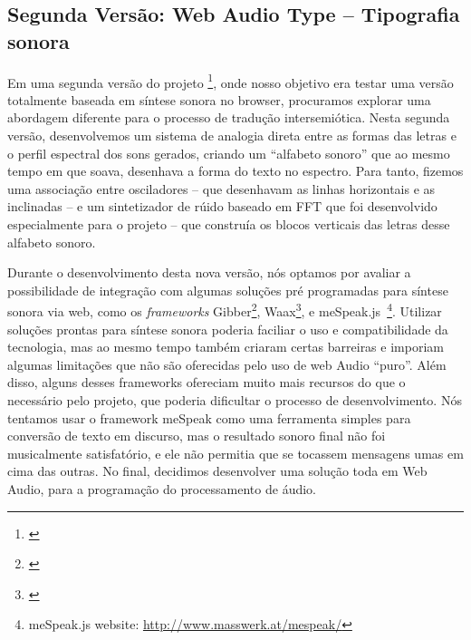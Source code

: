 \subsection{Segunda Versão: Web Audio Type -- Tipografia sonora}
Em uma segunda versão do projeto \footnote{\cite{Stolfi2017w}}, onde nosso objetivo era testar uma versão totalmente baseada em síntese sonora no browser, procuramos explorar uma abordagem diferente para o processo de tradução intersemiótica. Nesta segunda versão, desenvolvemos um sistema de analogia direta entre as formas das letras e o perfil espectral dos sons gerados, criando um ``alfabeto sonoro'' que ao mesmo tempo em que soava, desenhava a forma do texto no espectro. Para tanto, fizemos uma associação entre osciladores -- que desenhavam as linhas horizontais e as inclinadas -- e um sintetizador de rúido baseado em FFT que foi desenvolvido especialmente para o projeto -- que construía os blocos verticais das letras desse alfabeto sonoro.

Durante o desenvolvimento desta nova versão, nós optamos por avaliar a possibilidade de integração com algumas soluções pré programadas para síntese sonora via web, como os \emph{frameworks} Gibber\footnote{\cite{Roberts2012gibberlivecoding}}, Waax\footnote{\cite{Choi2013waax}}, e meSpeak.js~\footnote{meSpeak.js website: \url{http://www.masswerk.at/mespeak/}}. Utilizar soluções prontas para síntese sonora poderia faciliar o uso e compatibilidade da tecnologia, mas ao mesmo tempo também criaram certas barreiras e imporiam algumas limitações que não são oferecidas pelo uso de web Audio ``puro''. Além disso, alguns desses frameworks ofereciam muito mais recursos do que o necessário pelo projeto, que poderia dificultar o processo de desenvolvimento. Nós tentamos usar o framework meSpeak como uma ferramenta simples para conversão de texto em discurso, mas o resultado sonoro final não foi musicalmente satisfatório, e ele não permitia que se tocassem mensagens umas em cima das outras. No final, decidimos desenvolver uma solução toda em Web Audio, para a programação do processamento de áudio.




